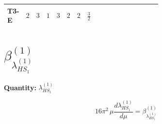 \documentclass[8pt]{article}
\begin{document}
\begin{landscape}
\begin{longtable}{@{}llcccccc >{\raggedright\arraybackslash}p{0.21\linewidth} >{\raggedright\arraybackslash}p{0.21\linewidth} >{\raggedright\arraybackslash}p{0.21\linewidth}@{}}
T3-E & $2$ & $3$ & $1$ & $3$ & $2$ & $2$ & $\frac{3}{2}$ & \scriptsize\adjustbox{max width=\linewidth}{$\begin{gathered} +8 {\lambda_{12}^{(1)}} {\lambda_{12}^{(\times)}}\end{gathered}$} & \scriptsize\adjustbox{max width=\linewidth}{$\begin{gathered} +6 {\lambda_{12}^{(A)}}^2\end{gathered}$} & \scriptsize\adjustbox{max width=\linewidth}{$\begin{gathered} +6 {\lambda_{12}^{(\times)}}^2\end{gathered}$} \\
\midrule
\bottomrule
\end{longtable}
\clearpage
\section*{$\beta_{\lambda_{HS_1}^{(1)}}^{(1)}$}
\noindent\textbf{Quantity: }$\lambda_{HS_1}^{(1)}$\par\smallskip
\[16\pi^2\,\mu\frac{d \lambda_{HS_1}^{(1)}}{d\mu}=\beta_{\lambda_{HS_1}^{(1)}}^{(1)}\]

\end{landscape}
\end{document}
